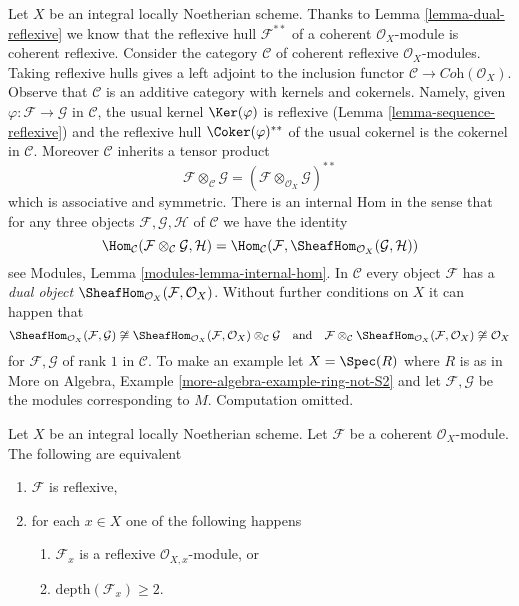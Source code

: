 \begin{remark}
\label{remark-tensor}
Let $X$ be an integral locally Noetherian scheme. Thanks to
Lemma \ref{lemma-dual-reflexive} we know that the reflexive
hull $\mathcal{F}^{**}$ of a coherent $\mathcal{O}_X$-module
is coherent reflexive. Consider the category $\mathcal{C}$
of coherent reflexive $\mathcal{O}_X$-modules. Taking
reflexive hulls gives a left adjoint to the inclusion functor
$\mathcal{C} \to \textit{Coh}(\mathcal{O}_X)$.
Observe that $\mathcal{C}$ is an additive category
with kernels and cokernels. Namely, given
$\varphi : \mathcal{F} \to \mathcal{G}$ in $\mathcal{C}$, the
usual kernel $\Ker(\varphi)$ is reflexive
(Lemma \ref{lemma-sequence-reflexive}) and the reflexive hull
$\Coker(\varphi)^{**}$ of the usual cokernel
is the cokernel in $\mathcal{C}$. Moreover $\mathcal{C}$ inherits
a tensor product
$$
\mathcal{F} \otimes_\mathcal{C} \mathcal{G} =
(\mathcal{F} \otimes_{\mathcal{O}_X} \mathcal{G})^{**}
$$
which is associative and symmetric. There is an internal Hom
in the sense that for any three objects
$\mathcal{F}, \mathcal{G}, \mathcal{H}$ of
$\mathcal{C}$ we have the identity
$$
\Hom_\mathcal{C}(\mathcal{F} \otimes_\mathcal{C} \mathcal{G}, \mathcal{H}) =
\Hom_\mathcal{C}(\mathcal{F},
\SheafHom_{\mathcal{O}_X}(\mathcal{G}, \mathcal{H}))
$$
see Modules, Lemma \ref{modules-lemma-internal-hom}. In $\mathcal{C}$
every object $\mathcal{F}$ has a {\it dual object}
$\SheafHom_{\mathcal{O}_X}(\mathcal{F}, \mathcal{O}_X)$.
Without further conditions on $X$ it can happen that
$$
\SheafHom_{\mathcal{O}_X}(\mathcal{F}, \mathcal{G}) \not \cong
\SheafHom_{\mathcal{O}_X}(\mathcal{F}, \mathcal{O}_X)
\otimes_\mathcal{C} \mathcal{G}
\quad\text{and}\quad
\mathcal{F} \otimes_\mathcal{C}
\SheafHom_{\mathcal{O}_X}(\mathcal{F}, \mathcal{O}_X)
\not \cong \mathcal{O}_X
$$
for $\mathcal{F}, \mathcal{G}$ of rank $1$ in $\mathcal{C}$.
To make an example let $X = \Spec(R)$ where $R$ is as in
More on Algebra, Example \ref{more-algebra-example-ring-not-S2}
and let $\mathcal{F}, \mathcal{G}$ be the modules corresponding to $M$.
Computation omitted.
\end{remark}

\begin{lemma}
\label{lemma-reflexive-depth-2}
Let $X$ be an integral locally Noetherian scheme. Let $\mathcal{F}$
be a coherent $\mathcal{O}_X$-module. The following are equivalent
\begin{enumerate}
\item $\mathcal{F}$ is reflexive,
\item for each $x \in X$ one of the following happens
\begin{enumerate}
\item $\mathcal{F}_x$ is a reflexive $\mathcal{O}_{X, x}$-module, or
\item $\text{depth}(\mathcal{F}_x) \geq 2$.
\end{enumerate}
\end{enumerate}
\end{lemma}

